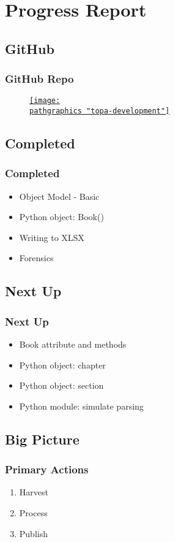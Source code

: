 \section{Progress Report}

\subsection{GitHub}
\begin{frame}
	\frametitle{GitHub Repo}
	\begin{figure}[htbp]
		\begin{center}
			\href{https://github.com/floquet/topa-development}{\texttt{[image: \\pathgraphics "topa-development"]}}
	\label{fig:github t-d}
	\end{center}
	\end{figure}
\end{frame}

\subsection{Completed}
\begin{frame}
	\frametitle{Completed}
		\begin{itemize}
			\item Object Model - Basic
			\item Python object: Book()
			\item Writing to XLSX
			\item Forensics
		\end{itemize}
\end{frame}

\subsection{Next Up}
\begin{frame}
	\frametitle{Next Up}
		\begin{itemize}
			\item Book attribute and methods
			\item Python object: chapter
			\item Python object: section
			\item Python module: simulate parsing
		\end{itemize}
\end{frame}

\subsection{Big Picture}
\begin{frame}
	\frametitle{Primary Actions}
	\begin{enumerate}
		\item Harvest  
		\item Process  
		\item Publish  
	\end{enumerate}
\end{frame}

